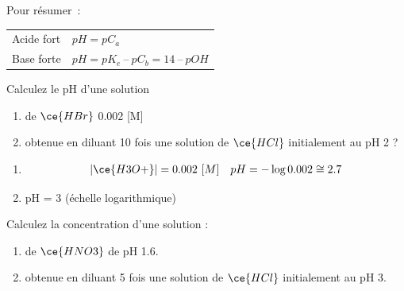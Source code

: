 \documentclass[
  11pt,
  a4paper,
  openany]{book}
\providecommand{\tightlist}{%
  \setlength{\itemsep}{0pt}\setlength{\parskip}{0pt}}
\begin{document}
Pour résumer~:

\begin{longtable}[]{@{}ll@{}}
\toprule()
\endhead
Acide fort & \(pH = pC_a\) \\
Base forte & \(pH = pK_e\ –\ pC_b = 14\ –\ pOH\) \\
\bottomrule()
\end{longtable}

\begin{Exercise}

Calculez le pH d'une solution

\begin{enumerate}
\def\labelenumi{\alph{enumi}.}
\tightlist
\item
  de \(\ce{HBr}\) 0.002 {[}M{]}
\item
  obtenue en diluant 10 fois une solution de \(\ce{HCl}\) initialement au pH 2 ?
\end{enumerate}

\end{Exercise}

\begin{Answer}

\begin{enumerate}
\def\labelenumi{\alph{enumi}.}
\tightlist
\item
  \[
  \begin{split}
  |\ce{H3O+}| = 0.002\ [M]
  \end{split}
  \quad
  \begin{split}
  pH = - \log 0.002 \cong 2.7
  \end{split}
  \]
\item
  pH = 3 (échelle logarithmique)
\end{enumerate}

\end{Answer}

\clearpage

\begin{Exercise}

Calculez la concentration d'une solution :

\begin{enumerate}
\def\labelenumi{\alph{enumi}.}
\tightlist
\item
  de \(\ce{HNO3}\) de pH 1.6.
\item
  obtenue en diluant 5 fois une solution de \(\ce{HCl}\) initialement au pH 3.
\end{enumerate}

\end{Exercise}
\end{document}
